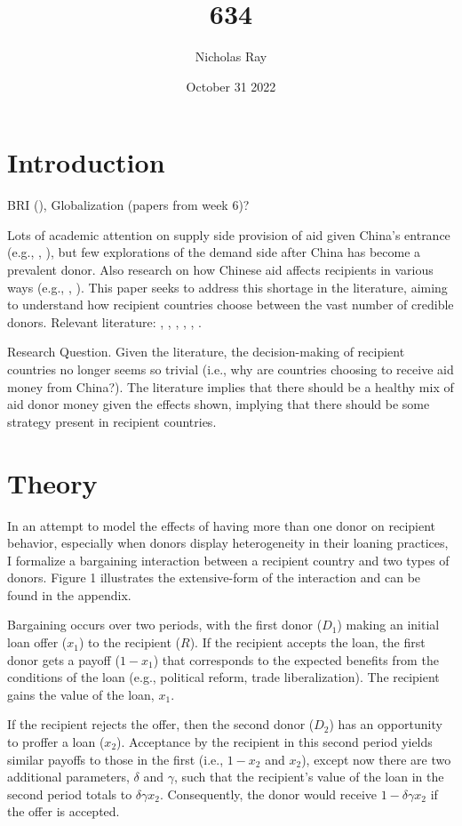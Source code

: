 \documentclass{article}
\title{\vspace{-2.75cm}634\vspace{-0.5cm}}
\author{Nicholas Ray}
\date{\vspace{-0.30cm}October 31 2022\vspace{-1cm}}
\begin{document}
\maketitle
\section*{Introduction}
BRI (\cite{dreher2022}), Globalization (papers from week 6)? 

Lots of academic attention on supply side provision of aid given China's entrance (e.g., \cite{dreher2018}, \cite{dreher2015}), but few explorations of the demand side after China has become a prevalent donor. Also research on how Chinese aid affects recipients in various ways (e.g., \cite{martorano2020}, \cite{bader2015}).
This paper seeks to address this shortage in the literature, aiming to understand how recipient countries choose between the vast number of credible donors. Relevant literature: \cite{kilama2016a}, \cite{hernandez2017}, \cite{li2017a}, \cite{isaksson2018}, \cite{humphrey2019}, \cite{broich2017a}.

Research Question. Given the literature, the decision-making of recipient countries no longer seems so trivial (i.e., why are countries choosing to receive aid money from China?). The literature implies that there should be a healthy mix of aid donor money given the effects shown, implying that there should be some strategy present in recipient countries.

\section*{Theory}
In an attempt to model the effects of having more than one donor on recipient behavior, especially when donors display heterogeneity in their loaning practices, I formalize a bargaining interaction between a recipient country and two types of donors. Figure 1 illustrates the extensive-form of the interaction and can be found in the appendix.  

Bargaining occurs over two periods, with the first donor ($D_1$) making an initial loan offer ($x_1$) to the recipient ($R$). If the recipient accepts the loan, the first donor gets a payoff ($1-x_1$) that corresponds to the expected benefits from the conditions of the loan (e.g., political reform, trade liberalization). The recipient gains the value of the loan, $x_1$.

If the recipient rejects the offer, then the second donor ($D_2$) has an opportunity to proffer a loan ($x_2$). Acceptance by the recipient in this second period yields similar payoffs to those in the first (i.e., $1-x_2$ and $x_2$), except now there are two additional parameters, $\delta$ and $\gamma$, such that the recipient's value of the loan in the second period totals to $\delta \gamma x_2$. Consequently, the donor would receive $1-\delta \gamma x_2$ if the offer is accepted.
\end{document}
